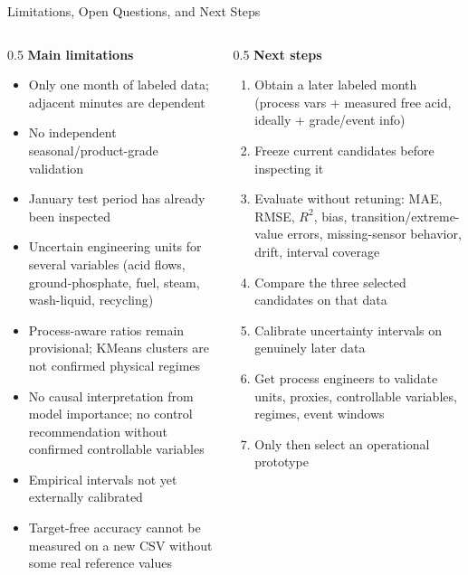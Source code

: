 \documentclass[11pt,aspectratio=169]{beamer}
\begin{document}
\begin{frame}{Limitations, Open Questions, and Next Steps}
\begin{columns}[T]
\begin{column}{0.5\textwidth}
\textbf{Main limitations}
\begin{itemize}
    \tiny
    \item Only one month of labeled data; adjacent minutes are dependent
    \item No independent seasonal/product-grade validation
    \item January test period has already been inspected
    \item Uncertain engineering units for several variables (acid flows, ground-phosphate, fuel, steam, wash-liquid, recycling)
    \item Process-aware ratios remain provisional; KMeans clusters are not confirmed physical regimes
    \item No causal interpretation from model importance; no control recommendation without confirmed controllable variables
    \item Empirical intervals not yet externally calibrated
    \item Target-free accuracy cannot be measured on a new CSV without some real reference values
\end{itemize}
\end{column}
\begin{column}{0.5\textwidth}
\textbf{Next steps}
\begin{enumerate}
    \tiny
    \item Obtain a later labeled month (process vars + measured free acid, ideally + grade/event info)
    \item Freeze current candidates before inspecting it
    \item Evaluate without retuning: MAE, RMSE, $R^2$, bias, transition/extreme-value errors, missing-sensor behavior, drift, interval coverage
    \item Compare the three selected candidates on that data
    \item Calibrate uncertainty intervals on genuinely later data
    \item Get process engineers to validate units, proxies, controllable variables, regimes, event windows
    \item Only then select an operational prototype
\end{enumerate}
\end{column}
\end{columns}
\end{frame}
\end{document}
